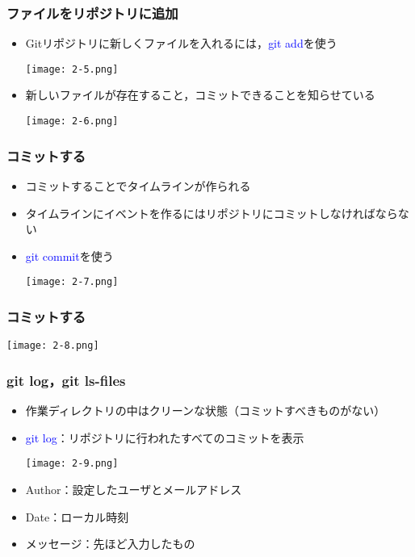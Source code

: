 \documentclass[dvipdfmx,11pt,notheorems]{beamer}
\begin{document}
\begin{frame}
\frametitle{ファイルをリポジトリに追加}
\begin{itemize}
\item Gitリポジトリに新しくファイルを入れるには，\textcolor{blue}{git add}を使う
\begin{center}
\texttt{[image: 2-5.png]}
\end{center}
\item 新しいファイルが存在すること，コミットできることを知らせている
\begin{center}
\texttt{[image: 2-6.png]}
\end{center}
\end{itemize}
\end{frame}

\begin{frame}
\frametitle{コミットする}
\begin{itemize}
\item コミットすることでタイムラインが作られる
\item タイムラインにイベントを作るにはリポジトリにコミットしなければならない
\item \textcolor{blue}{git commit}を使う
\begin{center}
\texttt{[image: 2-7.png]}
\end{center}
\end{itemize}
\end{frame}

\begin{frame}
\frametitle{コミットする}
\begin{center}
\texttt{[image: 2-8.png]}
\end{center}
\end{frame}

\begin{frame}
\frametitle{git log，git ls-files}
\begin{itemize}
\item 作業ディレクトリの中はクリーンな状態（コミットすべきものがない）
\item \textcolor{blue}{git log}：リポジトリに行われたすべてのコミットを表示
\begin{center}
\texttt{[image: 2-9.png]}
\end{center}
\item Author：設定したユーザとメールアドレス
\item Date：ローカル時刻
\item メッセージ：先ほど入力したもの
\end{itemize}
\end{frame}
\end{document}
